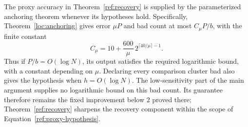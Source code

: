 The proxy accuracy in Theorem~\ref{ref:recovery} is supplied by the
parameterized anchoring theorem whenever its hypotheses hold.  Specifically,
Theorem~\ref{loc:anchoring} gives error $\mu P$ and bad count at most
$C_\mu P/b$, with the finite constant
\[
 C_\mu=10+\frac{600}{\mu}\,2^{\lceil40/\mu\rceil-1}.
\]
Thus if $P/b=O(\log N)$, its output satisfies the required logarithmic
bound, with a constant depending on $\mu$.  Declaring every comparison
cluster bad also gives the hypothesis when $h=O(\log N)$.
The low-sensitivity part of the main argument supplies no logarithmic bound
on this bad count.  Its guarantee therefore remains the fixed improvement
below $2$ proved there; Theorem~\ref{ref:recovery} sharpens the recovery
component within the scope of Equation~\eqref{ref:proxy-hypothesis}.
